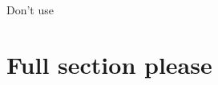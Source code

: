 \documentclass{article}
\begin{document}
Don't use 

\section{Full section please}\label{sec:some.label}
\end{document}
